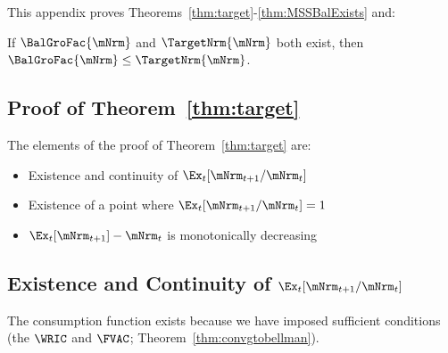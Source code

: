 \documentclass[\econtexRoot/BufferStockTheory]{subfiles}
\begin{document}

This appendix proves Theorems~\ref{thm:target}-\ref{thm:MSSBalExists} and:
\compilingassubfile{\setcounter{theorem}{1}}

  \begin{lemma}
  If $\BalGroFac{\mNrm}$ and $\TargetNrm{\mNrm}$ both exist, then $\BalGroFac{\mNrm} \leq \TargetNrm{\mNrm}$.
  \end{lemma}

  \begin{comment}
  \begin{lemma}\labelsafe{lemma:orderingPartTwo}
  If $\BalGroFac{\mNrm}$ and $\BalGroRte{\mNrm}$ both exist, then $\BalGroFac{\mNrm} \leq \BalGroRte{\mNrm}$.
  \end{lemma}
\end{comment}

 \subsection{Proof of Theorem~\ref{thm:target}}
%
  
  The elements of the proof of Theorem~\ref{thm:target} are:
\begin{itemize}
\item Existence and continuity of $\Ex_t [{\mNrm}_{t+1}/\mNrm_t]$
\item Existence of a point where $\Ex_t [{\mNrm}_{t+1}/\mNrm_t] = 1$
\item $\Ex_t [{\mNrm}_{t+1}]-\mNrm_{t}$ is monotonically decreasing
\end{itemize}


\subsection{Existence and Continuity of
  \texorpdfstring{$\Ex_t [{\mNrm}_{t+1}/\mNrm_t]$}{Ex-{t}[mNrm-{t+1}/mNrm-{t}]}}\label{subsubsec:RatExitsCont}
The consumption function exists because we have imposed sufficient conditions (the $\WRIC$ and $\FVAC$; Theorem~\ref{thm:convgtobellman}).
\end{document}
